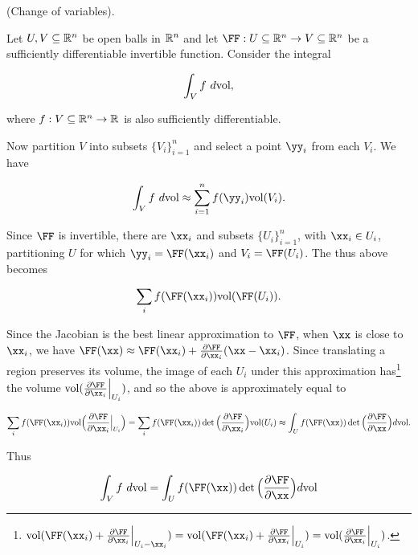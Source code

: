 \begin{deriv}
    (Change of variables).
    
    Let $U, V \subseteq \mathbb{R}^n$ be open balls in $\mathbb{R}^n$ and let $\FF:U \subseteq \R^n \rightarrow V \subseteq \R^n$ be a sufficiently differentiable invertible function. Consider the integral

    \begin{align*}
        \int_V f \text{ } d\text{vol},
    \end{align*}

    where $f:V \subseteq \mathbb{R}^n \rightarrow \mathbb{R}$ is also sufficiently differentiable.

    Now partition $V$ into subsets $\{V_i\}_{i = 1}^n$ and select a point $\yy_i$ from each $V_i$. We have

    \begin{align*}
        \int_V f \spc d\text{vol} \approx \sum_{i = 1}^n f(\yy_i) \text{vol}(V_i).
    \end{align*}

    Since $\FF$ is invertible, there are $\xx_i$ and subsets $\{U_i\}_{i = 1}^n$, with $\xx_i \in U_i$, partitioning $U$ for which $\yy_i = \FF(\xx_i)$ and $V_i = \FF(U_i)$. The thus above becomes

    \begin{align*}
        \sum_i f(\FF(\xx_i)) \text{vol}(\FF(U_i)).
    \end{align*}

    Since the Jacobian is the best linear approximation to $\FF$, when $\xx$ is close to $\xx_i$, we have $\FF(\xx) \approx \FF(\xx_i) + \frac{\pd \FF}{\pd \xx_i}(\xx - \xx_i)$. Since translating a region preserves its volume, the image of each $U_i$ under this approximation has\footnote{$\text{vol}(\FF(\xx_i) + \frac{\pd \FF}{\pd \xx_i}\Big|_{U_i - \xx_i}) = \text{vol}(\FF(\xx_i) + \frac{\pd \FF}{\pd \xx_i}\Big|_{U_i}) = \text{vol}(\frac{\pd \FF}{\pd \xx_i}\Big|_{U_i})$.} the volume $\text{vol}(\frac{\pd \FF}{\pd \xx_i}\Big|_{U_i})$, and so the above is approximately equal to

    \begin{align*}
        \sum_i f(\FF(\xx_i)) \text{vol}\Big(\frac{\pd \FF}{\pd \xx_i}\Big|_{U_i}\Big)
        =
        \sum_i f(\FF(\xx_i)) \det\Big( \frac{\pd \FF}{\pd \xx_i} \Big) \text{vol}(U_i)
        \approx 
        \int_U f(\FF(\xx)) \det\Big( \frac{\pd \FF}{\pd \xx} \Big) d\text{vol}.
    \end{align*}

    Thus

    \begin{align*}
        \int_V f \spc d\text{vol} = \int_U f(\FF(\xx)) \det\Big( \frac{\pd \FF}{\pd \xx} \Big) d \text{vol}
    \end{align*}
\end{deriv}

